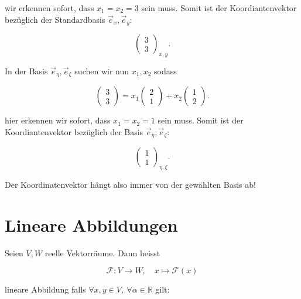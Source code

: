 wir erkennen sofort, dass \( x_1 = x_2 = 3 \) sein muss. Somit ist der Koordiantenvektor bezüglich der Standardbasis \( \vec{e}_x, \vec{e}_y \): 

\begin{equation*}
    \begin{pmatrix} 3 \\ 3 \end{pmatrix}_{x,y}. 
\end{equation*}

In der Basis \( \vec{e}_\eta, \vec{e}_\zeta \) suchen wir nun \( x_1, x_2 \) sodass

\begin{equation*}
    \begin{pmatrix} 3 \\ 3 \end{pmatrix} = x_1 \begin{pmatrix} 2 \\ 1 \end{pmatrix} + x_2 \begin{pmatrix} 1 \\ 2 \end{pmatrix}.
\end{equation*}

hier erkennen wir sofort, dass \( x_1 = x_2 = 1 \) sein muss. Somit ist der Koordiantenvektor bezüglich der Basis \( \vec{e}_\eta, \vec{e}_\zeta \):

\begin{equation*}
    \begin{pmatrix} 1 \\ 1 \end{pmatrix}_{\eta, \zeta}.
\end{equation*}

Der Koordinatenvektor hängt also immer von der gewählten Basis ab!

\newpage
\section{Lineare Abbildungen}  

Seien \( V, W \) reelle Vektorräume. Dann heisst

\begin{equation*}
    \mathcal{F}: V \rightarrow W, \quad x \mapsto \mathcal{F}(x)
\end{equation*}

\vspace{0.5\baselineskip}

lineare Abbildung falls \( \forall x, y \in V, \ \forall \alpha \in \mathbb{R} \) gilt:

